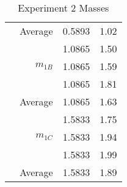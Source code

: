 \documentclass [12pt, letterpaper, twoside] {article}
\begin{document}
\begin {table}[h]
\begin {tabular} {| l | r | l | r |}
    & Average & 0.5893 & 1.02 \\ %
    \cline{2-4}
    & \multirow {3}{*}{\(m_{1B}\)} & 1.0865 & 1.50 \\
    & & 1.0865 & 1.59 \\
    & & 1.0865 & 1.81 \\
    \cline{2-4}
    & Average & 1.0865 & 1.63 \\ %
    \cline{2-4}
    & \multirow {3}{*}{\(m_{1C}\)} & 1.5833 & 1.75 \\
    & & 1.5833 & 1.94 \\
    & & 1.5833 & 1.99 \\
    \cline{2-4}
    & Average & 1.5833 & 1.89 \\ %
    \hline\hline
  \end {tabular}
  \caption {Experiment 2 Masses}
\end {table}
\end{document}
